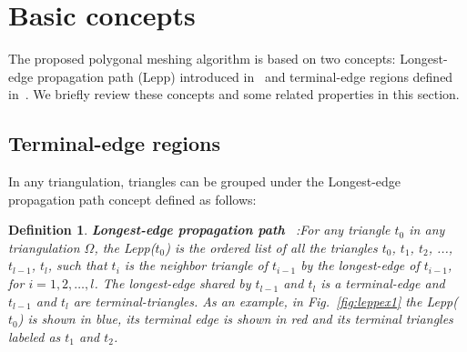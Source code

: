 \documentclass[lineno,pdflatex,sn-mathphys]{sn-jnl}%
\theoremstyle{thmstyleone}%
\theoremstyle{thmstyletwo}%
\theoremstyle{thmstylethree}%
\newtheorem{definition}{Definition}%
\begin{document}
%




\section{Basic concepts}
\label{sec:basic}


The proposed polygonal meshing algorithm is based on two concepts: Longest-edge propagation path (Lepp) introduced in~\cite{Rivara97} and terminal-edge regions defined in~\cite{Ascom209, Ojeda2018ANA}. We briefly review these concepts and some related properties in this section.

\subsection{Terminal-edge regions}

In any triangulation, triangles can be grouped under the Longest-edge propagation path concept defined as follows:



\begin{definition}{\textbf{Longest-edge propagation path }~\cite{Rivara97}:}\label{d:lepp}  
For any triangle $t_0$ in any triangulation $\Omega$, the Lepp($t_0$)
is the ordered list of all the triangles $t_0$, $t_1$, $t_2$, ..., $t_{l-1}$, $t_{l}$, such that $t_{i}$ is the neighbor triangle of $t_{i-1}$  by the longest-edge of $t_{i-1}$, for $i = 1,2,\dots,l$. The longest-edge shared by $t_{l-1}$ and $t_l$ is a terminal-edge and $t_{l-1}$ and  $t_l$ are terminal-triangles. As an example, in Fig.~\ref{fig:leppex1}  the Lepp($t_0$) is shown in blue, its terminal edge is shown in red  and its terminal triangles labeled as $t_1$ and $t_2$.
\end{definition}
\end{document}
